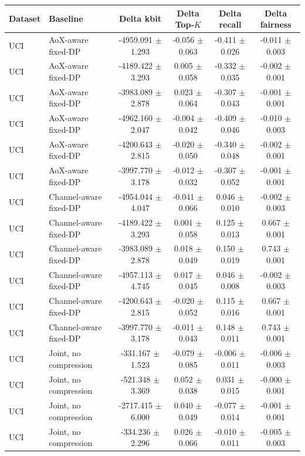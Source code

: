 \begin{tabular}{llcccc}
\toprule
Dataset & Baseline & Delta kbit & Delta Top-$K$ & Delta recall & Delta fairness \\
\midrule
UCI & AoX-aware fixed-DP & -4959.091 $\pm$ 1.293 & -0.056 $\pm$ 0.063 & -0.411 $\pm$ 0.026 & -0.011 $\pm$ 0.003 \\
UCI & AoX-aware fixed-DP & -4189.422 $\pm$ 3.293 & 0.005 $\pm$ 0.058 & -0.332 $\pm$ 0.035 & -0.002 $\pm$ 0.001 \\
UCI & AoX-aware fixed-DP & -3983.089 $\pm$ 2.878 & 0.023 $\pm$ 0.064 & -0.307 $\pm$ 0.043 & -0.001 $\pm$ 0.001 \\
UCI & AoX-aware fixed-DP & -4962.160 $\pm$ 2.047 & -0.004 $\pm$ 0.042 & -0.409 $\pm$ 0.046 & -0.010 $\pm$ 0.003 \\
UCI & AoX-aware fixed-DP & -4200.643 $\pm$ 2.815 & -0.020 $\pm$ 0.050 & -0.340 $\pm$ 0.048 & -0.002 $\pm$ 0.001 \\
UCI & AoX-aware fixed-DP & -3997.770 $\pm$ 3.178 & -0.012 $\pm$ 0.032 & -0.307 $\pm$ 0.052 & -0.001 $\pm$ 0.001 \\
UCI & Channel-aware fixed-DP & -4954.044 $\pm$ 4.047 & -0.041 $\pm$ 0.066 & 0.046 $\pm$ 0.010 & -0.002 $\pm$ 0.003 \\
UCI & Channel-aware fixed-DP & -4189.422 $\pm$ 3.293 & 0.001 $\pm$ 0.058 & 0.125 $\pm$ 0.013 & 0.667 $\pm$ 0.001 \\
UCI & Channel-aware fixed-DP & -3983.089 $\pm$ 2.878 & 0.018 $\pm$ 0.049 & 0.150 $\pm$ 0.019 & 0.743 $\pm$ 0.001 \\
UCI & Channel-aware fixed-DP & -4957.113 $\pm$ 4.745 & 0.017 $\pm$ 0.045 & 0.046 $\pm$ 0.008 & -0.002 $\pm$ 0.003 \\
UCI & Channel-aware fixed-DP & -4200.643 $\pm$ 2.815 & -0.020 $\pm$ 0.052 & 0.115 $\pm$ 0.016 & 0.667 $\pm$ 0.001 \\
UCI & Channel-aware fixed-DP & -3997.770 $\pm$ 3.178 & -0.011 $\pm$ 0.043 & 0.148 $\pm$ 0.011 & 0.743 $\pm$ 0.001 \\
UCI & Joint, no compression & -331.167 $\pm$ 1.523 & -0.079 $\pm$ 0.085 & -0.006 $\pm$ 0.011 & -0.006 $\pm$ 0.003 \\
UCI & Joint, no compression & -521.348 $\pm$ 3.369 & 0.052 $\pm$ 0.038 & 0.031 $\pm$ 0.015 & -0.000 $\pm$ 0.001 \\
UCI & Joint, no compression & -2717.415 $\pm$ 6.000 & 0.040 $\pm$ 0.049 & -0.077 $\pm$ 0.014 & -0.001 $\pm$ 0.001 \\
UCI & Joint, no compression & -334.236 $\pm$ 2.296 & 0.026 $\pm$ 0.066 & -0.010 $\pm$ 0.011 & -0.005 $\pm$ 0.003 \\

\end{tabular}
